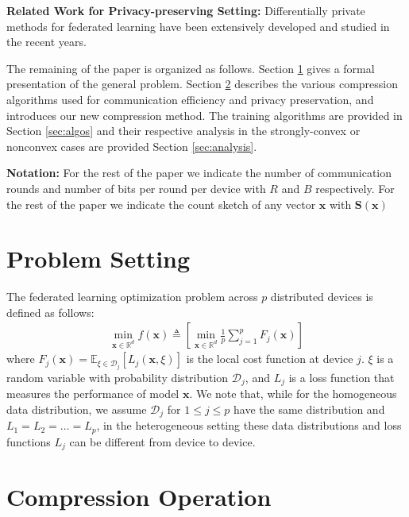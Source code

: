 \documentclass[review,onefignum,onetabnum]{siamart190516}
\begin{document}
\textbf{Related Work for Privacy-preserving Setting:} Differentially private methods for federated learning have been extensively developed and studied in the recent years. 



The remaining of the paper is organized as follows.
Section \ref{sec:problem} gives a formal presentation of the general problem. 
Section \ref{sec:compression} describes the various compression algorithms used for communication efficiency and privacy preservation, and introduces our new compression method.
The training algorithms are provided in Section \ref{sec:algos} and their respective analysis in the strongly-convex or nonconvex cases are provided Section \ref{sec:analysis}.

\textbf{Notation:} For the rest of the paper we indicate the number of communication rounds and number of bits per round per device with $R$ and $B$ respectively. For the rest of the paper we indicate the count sketch of any vector $\boldsymbol{x}$ with $\mathbf{S}(\boldsymbol{x})$
 
\section{Problem Setting}\label{sec:problem}
The federated learning optimization problem across $p$ distributed devices is defined as follows:
\begin{align}\label{eq:main}
   \min_{\boldsymbol{x}\in \mathbb{R}^{d}} f(\boldsymbol{x})\triangleq \left[\min_{\boldsymbol{x}\in \mathbb{R}^{d}}\frac{1}{p}\sum_{j=1}^{p}F_j(\boldsymbol{x})\right]
\end{align}
where $F_j(\boldsymbol{x})=\mathbb{E}_{\xi\in\mathcal{D}_j}\left[L_j\left(\boldsymbol{x},\xi\right)\right]$ is the local cost function at device $j$.
$\xi$ is a random variable with probability distribution $\mathcal{D}_j$, and $L_j$ is a loss function that measures the performance of model $\boldsymbol{x}$. 
We note that, while for the homogeneous data distribution, we assume $\mathcal{D}_j$ for $1\leq j\leq p$ have the same distribution and $L_1=L_2=\ldots=L_p$, in the heterogeneous setting these data distributions and loss functions $L_j$ can be different from device to device. 


\section{Compression Operation}\label{sec:compression}
\end{document}
